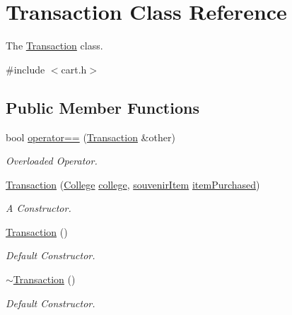\hypertarget{class_transaction}{}\section{Transaction Class Reference}
\label{class_transaction}


The \mbox{\hyperlink{class_transaction}{Transaction}} class.  




{\ttfamily \#include $<$cart.\+h$>$}

\subsection*{Public Member Functions}
\begin{DoxyCompactItemize}
\item 
bool \mbox{\hyperlink{class_transaction_af91c48f0072425f2c65cb3689ca6c653}{operator==}} (\mbox{\hyperlink{class_transaction}{Transaction}} \&other)
\begin{DoxyCompactList}\small\item\em Overloaded Operator. \end{DoxyCompactList}\item 
\mbox{\hyperlink{class_transaction_a027ee3210228e05081452160100a65df}{Transaction}} (\mbox{\hyperlink{struct_college}{College}} \mbox{\hyperlink{class_transaction_a8789961780bef7d71a64eb894fb57d84}{college}}, \mbox{\hyperlink{structsouvenir_item}{souvenir\+Item}} \mbox{\hyperlink{class_transaction_a2526fe971714943e90457cc9bce61b56}{item\+Purchased}})
\begin{DoxyCompactList}\small\item\em A Constructor. \end{DoxyCompactList}\item 
\mbox{\label{class_transaction_ab47005b855d38bc324bb79fd023baa13}} 
\mbox{\hyperlink{class_transaction_ab47005b855d38bc324bb79fd023baa13}{Transaction}} ()
\begin{DoxyCompactList}\small\item\em Default Constructor. \end{DoxyCompactList}\item 
\mbox{\label{class_transaction_a362b0d2524d0c799165190517192dca9}} 
\mbox{\hyperlink{class_transaction_a362b0d2524d0c799165190517192dca9}{$\sim$\+Transaction}} ()
\begin{DoxyCompactList}\small\item\em Default Constructor. \end{DoxyCompactList}\end{DoxyCompactItemize}
